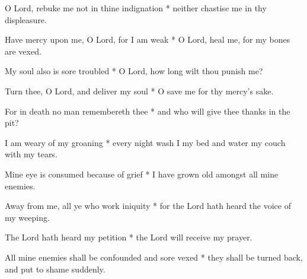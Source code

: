 O Lord, rebuke me not in thine indignation * neither chastise me in thy displeasure.

Have mercy upon me, O Lord, for I am weak * O Lord, heal me, for my bones are vexed.

My soul also is sore troubled * O Lord, how long wilt thou punish me?

Turn thee, O Lord, and deliver my soul * O save me for thy mercy's sake.

For in death no man remembereth thee * and who will give thee thanks in the pit?

I am weary of my groaning * every night wash I my bed and water my couch with my tears.

Mine eye is consumed because of grief * I have grown old amongst all mine enemies.

Away from me, all ye who work iniquity * for the Lord hath heard the voice of my weeping.

The Lord hath heard my petition * the Lord will receive my prayer.

All mine enemies shall be confounded and sore vexed * they shall be turned back, and put to shame suddenly.